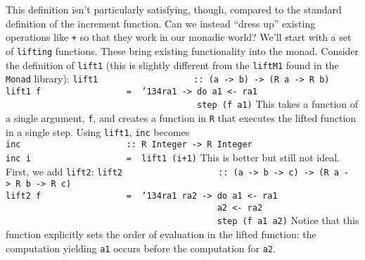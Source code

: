 This definition isn't particularly satisfying, though, compared to the
standard definition of the increment function.  Can we instead ``dress
up'' existing operations like \mbox{\tt +} so that they work in our monadic
world?  We'll start with a set of {\tt lifting} functions.  These 
bring existing functionality into the monad.  Consider the definition
of \mbox{\tt lift1} (this is slightly different from the \mbox{\tt liftM1} found in the
\mbox{\tt Monad} library):
\bprog
\mbox{\tt lift1\ \ \ \ \ \ \ \ \ \ \ \ \ \ \ \ \ \ \ ::\ (a\ ->\ b)\ ->\ (R\ a\ ->\ R\ b)}\\
\mbox{\tt lift1\ f\ \ \ \ \ \ \ \ \ \ \ \ \ \ \ \ \ =\ \ {\char'134}ra1\ ->\ do\ a1\ <-\ ra1}\\
\mbox{\tt \ \ \ \ \ \ \ \ \ \ \ \ \ \ \ \ \ \ \ \ \ \ \ \ \ \ \ \ \ \ \ \ \ \ \ \ \ \ step\ (f\ a1)}
\eprog
This takes a function of a single argument, \mbox{\tt f}, and creates a
function in \mbox{\tt R} that executes the lifted function in a single step.
Using \mbox{\tt lift1}, \mbox{\tt inc} becomes
\bprog
\mbox{\tt inc\ \ \ \ \ \ \ \ \ \ \ \ \ \ \ \ \ \ \ \ \ ::\ R\ Integer\ ->\ R\ Integer}\\
\mbox{\tt inc\ i\ \ \ \ \ \ \ \ \ \ \ \ \ \ \ \ \ \ \ =\ \ lift1\ (i+1)}
\eprog
This is better but still not ideal.  First, we add \mbox{\tt lift2}:
\bprog
\mbox{\tt lift2\ \ \ \ \ \ \ \ \ \ \ \ \ \ \ \ \ \ \ ::\ (a\ ->\ b\ ->\ c)\ ->\ (R\ a\ ->\ R\ b\ ->\ R\ c)}\\
\mbox{\tt lift2\ f\ \ \ \ \ \ \ \ \ \ \ \ \ \ \ \ \ =\ \ {\char'134}ra1\ ra2\ ->\ do\ a1\ <-\ ra1}\\
\mbox{\tt \ \ \ \ \ \ \ \ \ \ \ \ \ \ \ \ \ \ \ \ \ \ \ \ \ \ \ \ \ \ \ \ \ \ \ \ \ \ \ \ \ \ a2\ <-\ ra2}\\
\mbox{\tt \ \ \ \ \ \ \ \ \ \ \ \ \ \ \ \ \ \ \ \ \ \ \ \ \ \ \ \ \ \ \ \ \ \ \ \ \ \ \ \ \ \ step\ (f\ a1\ a2)}
\eprog
Notice that this function explicitly sets the order of evaluation in
the lifted function: the computation yielding \mbox{\tt a1} occurs before the
computation for \mbox{\tt a2}.

